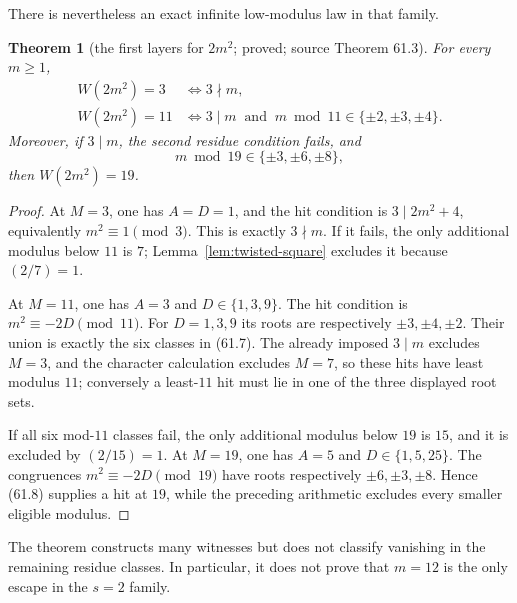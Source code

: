 \documentclass[10pt,reqno]{amsart}
\newtheorem{theorem}{Theorem}[section]
\theoremstyle{definition}
\newcommand{\1}{\mathbf 1}
\begin{document}
There is nevertheless an exact infinite low-modulus law in that family.

\begin{theorem}[the first layers for $2m^2$; proved; source Theorem 61.3]
\label{thm:two-square-layers}
For every $m\geq1$,
\begin{equation}\tag{61.7}
\begin{array}{ll}
W(2m^2)=3
 &\Longleftrightarrow 3\nmid m,\\
W(2m^2)=11
 &\Longleftrightarrow 3\mid m\ \text{ and }\
 m\bmod11\in\{\mathord\pm2,\mathord\pm3,\mathord\pm4\}.
\end{array}
\end{equation}
Moreover, if $3\mid m$, the second residue condition fails, and
\begin{equation}\tag{61.8}
 m\bmod19\in\{\mathord\pm3,\mathord\pm6,\mathord\pm8\},
\end{equation}
then $W(2m^2)=19$.
\end{theorem}
\begin{proof}
At $M=3$, one has $A=D=1$, and the hit condition is
$3\mid2m^2+4$, equivalently $m^2\equiv1\pmod3$.  This is exactly
$3\nmid m$.  If it fails, the only additional modulus below $11$ is $7$;
Lemma~\ref{lem:twisted-square} excludes it because $(2/7)=1$.

At $M=11$, one has $A=3$ and $D\in\{1,3,9\}$.  The hit condition is
$m^2\equiv-2D\pmod {11}$.  For $D=1,3,9$ its roots are respectively
$\mathord\pm3,\mathord\pm4,\mathord\pm2$.  Their union is exactly the six
classes in (61.7).  The already imposed $3\mid m$ excludes $M=3$, and the
character calculation excludes $M=7$, so these hits have least modulus
$11$; conversely a least-$11$ hit must lie in one of the three displayed
root sets.

If all six mod-$11$ classes fail, the only additional modulus below $19$ is
$15$, and it is excluded by $(2/15)=1$.  At $M=19$, one has $A=5$ and
$D\in\{1,5,25\}$.  The congruences
$m^2\equiv-2D\pmod {19}$ have roots respectively
$\mathord\pm6,\mathord\pm3,\mathord\pm8$.  Hence (61.8) supplies a hit at
$19$, while the preceding arithmetic excludes every smaller eligible
modulus.
\end{proof}
The theorem constructs many witnesses but does not classify vanishing in
the remaining residue classes.  In particular, it does not prove that
$m=12$ is the only escape in the $s=2$ family.
\end{document}
